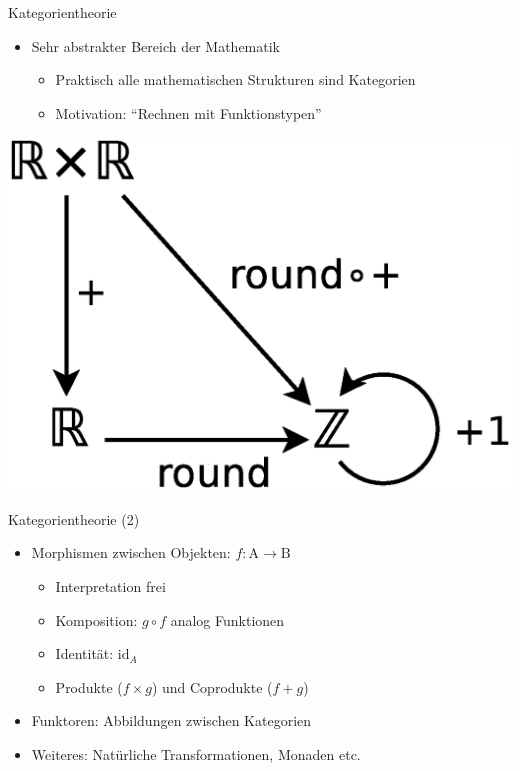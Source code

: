 \documentclass{beamer}
\newcommand\ato{\rightarrow} %
\begin{document}
\begin{frame}{Kategorientheorie}
  \begin{itemize}
  \item Sehr abstrakter Bereich der Mathematik
    \begin{itemize}    
    \item Praktisch alle mathematischen Strukturen sind Kategorien
    \item Motivation: ``Rechnen mit Funktionstypen''
    \end{itemize}
  \end{itemize}
  \begin{center}
    \includegraphics[scale=0.3]{images/cat_funs}
  \end{center}
\end{frame}

\begin{frame}{Kategorientheorie (2)}
  \begin{itemize}
  \item Morphismen zwischen Objekten: $f: \mathrm{A} \ato \mathrm{B}$
    \begin{itemize}
    \item Interpretation frei
    \item Komposition: $g \circ f$ analog Funktionen
    \item Identität: $\mathrm{id}_{A}$
    \item Produkte ($f \times g$) und Coprodukte ($f + g$)
    \end{itemize}
  \item Funktoren: Abbildungen zwischen Kategorien
  \item Weiteres: Natürliche Transformationen, Monaden etc.
  \end{itemize}
\end{frame}
\end{document}
